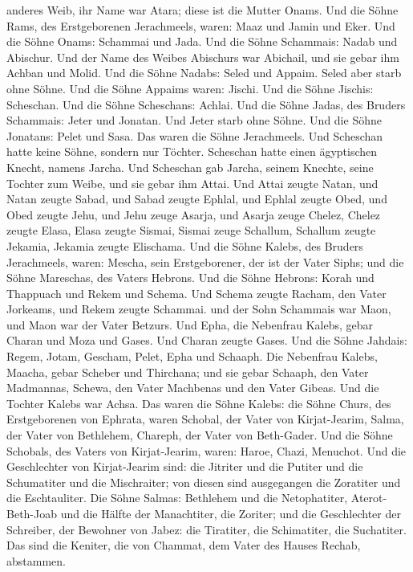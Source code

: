 anderes Weib, ihr Name war Atara; diese ist die Mutter Onams.
 Und die Söhne Rams, des Erstgeborenen Jerachmeels,
waren: Maaz und Jamin und Eker.  Und die Söhne Onams:
Schammai und Jada. Und die Söhne Schammais: Nadab und Abischur.
 Und der Name des Weibes Abischurs war Abichail, und sie
gebar ihm Achban und Molid.  Und die Söhne Nadabs: Seled
und Appaim. Seled aber starb ohne Söhne.  Und die Söhne
Appaims waren: Jischi. Und die Söhne Jischis: Scheschan. Und die Söhne
Scheschans: Achlai.  Und die Söhne Jadas, des Bruders
Schammais: Jeter und Jonatan.  Und Jeter starb ohne
Söhne. Und die Söhne Jonatans: Pelet und Sasa. Das waren die Söhne
Jerachmeels.  Und Scheschan hatte keine Söhne, sondern
nur Töchter.  Scheschan hatte einen ägyptischen Knecht,
namens Jarcha. Und Scheschan gab Jarcha, seinem Knechte, seine Tochter
zum Weibe, und sie gebar ihm Attai.  Und Attai zeugte
Natan, und Natan zeugte Sabad,  und Sabad zeugte Ephlal,
und Ephlal zeugte Obed,  und Obed zeugte Jehu,
 und Jehu zeuge Asarja, und Asarja zeuge Chelez, Chelez
zeugte Elasa, Elasa zeugte Sismai,  Sismai zeuge
Schallum,  Schallum zeugte Jekamia, Jekamia zeugte
Elischama.  Und die Söhne Kalebs, des Bruders
Jerachmeels, waren: Mescha, sein Erstgeborener, der ist der Vater Siphs;
und die Söhne Mareschas, des Vaters Hebrons.  Und die
Söhne Hebrons: Korah und Thappuach und Rekem und Schema. 
Und Schema zeugte Racham, den Vater Jorkeams, und Rekem zeugte Schammai.
 und der Sohn Schammais war Maon, und Maon war der Vater
Betzurs.  Und Epha, die Nebenfrau Kalebs, gebar Charan
und Moza und Gases. Und Charan zeugte Gases.  Und die
Söhne Jahdais: Regem, Jotam, Gescham, Pelet, Epha und Schaaph.
 Die Nebenfrau Kalebs, Maacha, gebar Scheber und
Thirchana;  und sie gebar Schaaph, den Vater Madmannas,
Schewa, den Vater Machbenas und den Vater Gibeas. Und die Tochter Kalebs
war Achsa.  Das waren die Söhne Kalebs: die Söhne Churs,
des Erstgeborenen von Ephrata, waren Schobal, der Vater von
Kirjat-Jearim,  Salma, der Vater von Bethlehem, Chareph,
der Vater von Beth-Gader.  Und die Söhne Schobals, des
Vaters von Kirjat-Jearim, waren: Haroe, Chazi, Menuchot. 
Und die Geschlechter von Kirjat-Jearim sind: die Jitriter und die
Putiter und die Schumatiter und die Mischraiter; von diesen sind
ausgegangen die Zoratiter und die Eschtauliter.  Die
Söhne Salmas: Bethlehem und die Netophatiter, Aterot-Beth-Joab und die
Hälfte der Manachtiter, die Zoriter;  und die
Geschlechter der Schreiber, der Bewohner von Jabez: die Tiratiter, die
Schimatiter, die Suchatiter. Das sind die Keniter, die von Chammat, dem
Vater des Hauses Rechab, abstammen.


